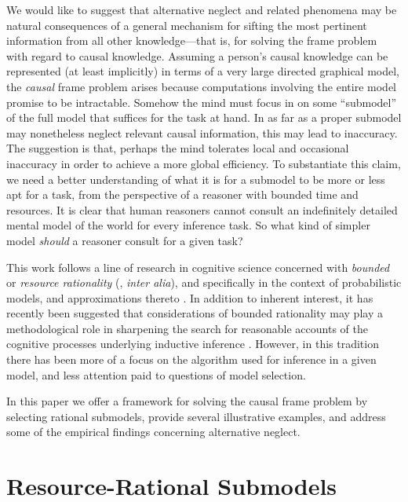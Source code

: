 \documentclass[10pt,letterpaper]{article}
\begin{document}
We would like to suggest that alternative neglect and related phenomena may be natural consequences of a general mechanism for sifting the most pertinent information from all other knowledge---that is, for solving the frame problem with regard to causal knowledge. Assuming a person's causal knowledge can be represented (at least implicitly) in terms of a very large directed graphical model, the \emph{causal} frame problem arises because computations involving the entire model promise to be intractable. Somehow the mind must focus in on some ``submodel'' of the full model that suffices for the task at hand. In as far as a proper submodel may nonetheless neglect relevant causal information, this may lead to inaccuracy. The suggestion is that, perhaps the mind tolerates local and occasional inaccuracy in order to achieve a more global efficiency. 
To substantiate this claim, we need a better understanding of what it is for a submodel to be more or less apt for a task, from the perspective of a reasoner with bounded time and resources. It is clear that human reasoners cannot consult an indefinitely detailed mental model of the world for every inference task. So what kind of simpler model \emph{should} a reasoner consult for a given task?

This work follows a line of research in cognitive science concerned with \emph{bounded} or \emph{resource rationality} (\citealt{Simon1957,Gigerenzer1996}, \emph{inter alia}), and specifically in the context of probabilistic models, and approximations thereto \citep{Vul2014}. In addition to inherent interest, it has recently been suggested that considerations of bounded rationality may play a methodological role in sharpening the search for reasonable accounts of the cognitive processes underlying inductive inference \citep{Griffiths2014,Icard2014}. However, in this tradition there has been more of a focus on the algorithm used for inference in a given model, and less attention paid to questions of model selection.

In this paper we offer a framework for solving the causal frame problem by selecting rational submodels, provide several illustrative examples, and address some of the empirical findings concerning alternative neglect.

\section{Resource-Rational Submodels}
\end{document}
